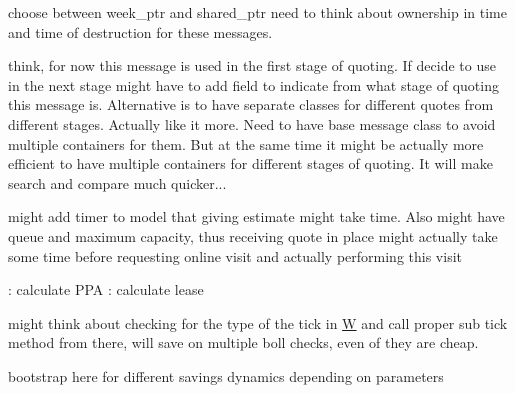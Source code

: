 \begin{DoxyRefList}
choose between week\+\_\+ptr and shared\+\_\+ptr need to think about ownership in time and time of destruction for these messages.  
\item[\label{_dev_stage2__DevStage2000025}%
\hypertarget{_dev_stage2__DevStage2000025}{}%
Class \hyperlink{classsolar__core_1_1_mes_marketing_s_e_i_online_quote}{solar\+\_\+core\+:\+:Mes\+Marketing\+S\+E\+I\+Online\+Quote} ]think, for now this message is used in the first stage of quoting. If decide to use in the next stage might have to add field to indicate from what stage of quoting this message is. Alternative is to have separate classes for different quotes from different stages. Actually like it more. Need to have base message class to avoid multiple containers for them. But at the same time it might be actually more efficient to have multiple containers for different stages of quoting. It will make search and compare much quicker... 
\item[\label{_dev_stage2__DevStage2000017}%
\hypertarget{_dev_stage2__DevStage2000017}{}%
Class \hyperlink{classsolar__core_1_1_s_e_i}{solar\+\_\+core\+:\+:S\+E\+I} ]might add timer to model that giving estimate might take time. Also might have queue and maximum capacity, thus receiving quote in place might actually take some time before requesting online visit and actually performing this visit 
\item[\label{_dev_stage2__DevStage2000016}%
\hypertarget{_dev_stage2__DevStage2000016}{}%
Member \hyperlink{classsolar__core_1_1_s_e_i_ab84401c625f5c459accf430535e4a06d}{solar\+\_\+core\+:\+:S\+E\+I\+:\+:ac\+\_\+estimate\+\_\+savings} (\hyperlink{classsolar__core_1_1_p_v_design}{P\+V\+Design} \&design, std\+::shared\+\_\+ptr$<$ P\+V\+Project $>$ project\+\_\+)]\+: calculate P\+P\+A \+: calculate lease  
\item[\label{_dev_stage2__DevStage2000018}%
\hypertarget{_dev_stage2__DevStage2000018}{}%
Member \hyperlink{classsolar__core_1_1_s_e_i_ab0bd6ae650afc15fe71ce545373ab16e}{solar\+\_\+core\+:\+:S\+E\+I\+:\+:act\+\_\+tick} ()]might think about checking for the type of the tick in \hyperlink{classsolar__core_1_1_w}{W} and call proper sub tick method from there, will save on multiple boll checks, even of they are cheap.  
\item[\label{_dev_stage2__DevStage2000015}%
\hypertarget{_dev_stage2__DevStage2000015}{}%
Member \hyperlink{classsolar__core_1_1_s_e_i_a807561ad055ddc0df91b80ba406ee6df}{solar\+\_\+core\+:\+:S\+E\+I\+:\+:form\+\_\+design} (std\+::shared\+\_\+ptr$<$ P\+V\+Project $>$ project\+\_\+)]bootstrap here for different savings dynamics depending on parameters  

\end{DoxyRefList}
